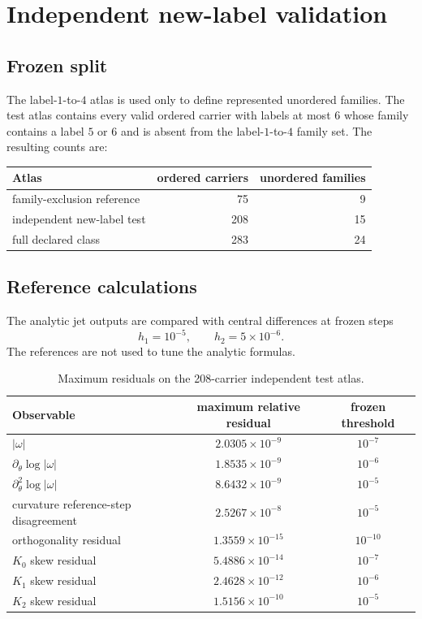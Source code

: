 \section{Independent new-label validation}
\subsection{Frozen split}
The label-$1$-to-$4$ atlas is used only to define represented unordered families.  The test atlas contains every valid ordered carrier with labels at most $6$ whose family contains a label $5$ or $6$ and is absent from the label-$1$-to-$4$ family set.  The resulting counts are:
\begin{center}
\begin{tabular}{lrr}
\toprule
Atlas & ordered carriers & unordered families\\
\midrule
family-exclusion reference & 75 & 9\\
independent new-label test & 208 & 15\\
full declared class & 283 & 24\\
\bottomrule
\end{tabular}
\end{center}

\subsection{Reference calculations}
The analytic jet outputs are compared with central differences at frozen steps
\begin{equation}
h_1=10^{-5},
\qquad
h_2=5\times10^{-6}.
\label{eq:fdsteps}
\end{equation}
The references are not used to tune the analytic formulas.

\begin{table}[ht]
\centering
\caption{Maximum residuals on the 208-carrier independent test atlas.}
\label{tab:residuals}
\begin{tabular}{lcc}
\toprule
Observable & maximum relative residual & frozen threshold\\
\midrule
$|\omega|$ & $2.0305\times10^{-9}$ & $10^{-7}$\\
$\partial_\theta\log|\omega|$ & $1.8535\times10^{-9}$ & $10^{-6}$\\
$\partial_\theta^2\log|\omega|$ & $8.6432\times10^{-9}$ & $10^{-5}$\\
curvature reference-step disagreement & $2.5267\times10^{-8}$ & $10^{-5}$\\
orthogonality residual & $1.3559\times10^{-15}$ & $10^{-10}$\\
$K_0$ skew residual & $5.4886\times10^{-14}$ & $10^{-7}$\\
$K_1$ skew residual & $2.4628\times10^{-12}$ & $10^{-6}$\\
$K_2$ skew residual & $1.5156\times10^{-10}$ & $10^{-5}$\\
\bottomrule
\end{tabular}
\end{table}

